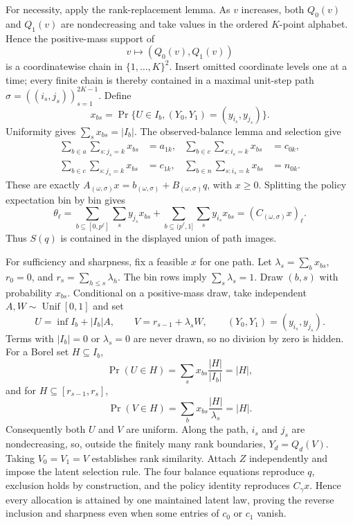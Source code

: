 For necessity, apply the rank-replacement lemma.  As \(v\) increases, both \(Q_0(v)\) and \(Q_1(v)\) are nondecreasing and take values in the ordered \(K\)-point alphabet.  Hence the positive-mass support of
\[
v\longmapsto (Q_0(v),Q_1(v))
\]
is a coordinatewise chain in \(\{1,\ldots,K\}^2\).  Insert omitted coordinate levels one at a time; every finite chain is thereby contained in a maximal unit-step path \(\sigma=((i_s,j_s))_{s=1}^{2K-1}\).  Define
\[
x_{bs}=\Pr\{U\in I_b,(Y_0,Y_1)=(y_{i_s},y_{j_s})\}.
\]
Uniformity gives \(\sum_sx_{bs}=|I_b|\).  The observed-balance lemma and selection give
\[
\begin{aligned}
\sum_{b\in a}\sum_{s:j_s=k}x_{bs}&=a_{1k},&
\sum_{b\in c}\sum_{s:i_s=k}x_{bs}&=c_{0k},\\
\sum_{b\in c}\sum_{s:j_s=k}x_{bs}&=c_{1k},&
\sum_{b\in n}\sum_{s:i_s=k}x_{bs}&=n_{0k}.
\end{aligned}
\]
These are exactly \(A_{(\omega,\sigma)}x=b_{(\omega,\sigma)}+B_{(\omega,\sigma)}q\), with \(x\ge0\).  Splitting the policy expectation bin by bin gives
\[
\theta_\ell
=\sum_{b\subseteq[0,p^\ell]}\sum_s y_{j_s}x_{bs}
 +\sum_{b\subseteq(p^\ell,1]}\sum_s y_{i_s}x_{bs}
=(C_{(\omega,\sigma)}x)_\ell.
\]
Thus \(S(q)\) is contained in the displayed union of path images.

For sufficiency and sharpness, fix a feasible \(x\) for one path.  Let \(\lambda_s=\sum_bx_{bs}\), \(r_0=0\), and \(r_s=\sum_{h\le s}\lambda_h\).  The bin rows imply \(\sum_s\lambda_s=1\).  Draw \((b,s)\) with probability \(x_{bs}\).  Conditional on a positive-mass draw, take independent \(A,W\sim\operatorname{Unif}[0,1]\) and set
\[
U=\inf I_b+|I_b|A,\qquad V=r_{s-1}+\lambda_sW,\qquad
(Y_0,Y_1)=(y_{i_s},y_{j_s}).
\]
Terms with \(|I_b|=0\) or \(\lambda_s=0\) are never drawn, so no division by zero is hidden.  For a Borel set \(H\subseteq I_b\),
\[
\Pr(U\in H)=\sum_sx_{bs}\frac{|H|}{|I_b|}=|H|,
\]
and for \(H\subseteq[r_{s-1},r_s]\),
\[
\Pr(V\in H)=\sum_bx_{bs}\frac{|H|}{\lambda_s}=|H|.
\]
Consequently both \(U\) and \(V\) are uniform.  Along the path, \(i_s\) and \(j_s\) are nondecreasing, so, outside the finitely many rank boundaries, \(Y_d=Q_d(V)\).  Taking \(V_0=V_1=V\) establishes rank similarity.  Attach \(Z\) independently and impose the latent selection rule.  The four balance equations reproduce \(q\), exclusion holds by construction, and the policy identity reproduces \(C_\gamma x\).  Hence every allocation is attained by one maintained latent law, proving the reverse inclusion and sharpness even when some entries of \(c_0\) or \(c_1\) vanish.

